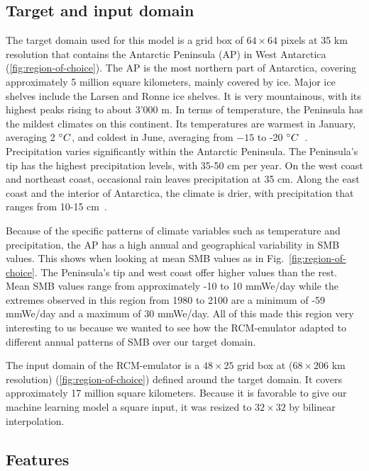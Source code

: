 \documentclass[a4paper,11pt,oneside]{report}
\begin{document}
\subsection{Target and input domain}
The target domain used for this model is a grid box of $64 \times 64$ pixels at 35 \si{km} resolution that contains the Antarctic Peninsula (AP) in West Antarctica (\autoref{fig:region-of-choice}). The AP is the most northern part of Antarctica, covering approximately 5 million square kilometers, mainly covered by ice. Major ice shelves include the Larsen and Ronne ice shelves. It is very mountainous, with its highest peaks rising to about 3'000 \si{m}. In terms of temperature, the Peninsula has the mildest climates on this continent. Its temperatures are warmest in January, averaging 2 $\degree C$, and coldest in June, averaging from $-15$ to -20 $\degree C$~\cite{AntarcticPeninsula}. Precipitation varies significantly within the Antarctic Peninsula. The Peninsula's tip has the highest precipitation levels, with 35-50 \si{cm} per year. On the west coast and northeast coast, occasional rain leaves precipitation at 35 \si{cm}. Along the east coast and the interior of Antarctica, the climate is drier, with precipitation that ranges from 10-15 \si{cm}~\cite{antarctic-climate, antarctic-climate-2}. 


 Because of the specific patterns of climate variables such as temperature and precipitation, the AP has a high annual and geographical variability in SMB values. This shows when looking at mean SMB values as in Fig.~\ref{fig:region-of-choice}. The Peninsula's tip and west coast offer higher values than the rest. Mean SMB values range from approximately -10 to 10 \si{mmWe/day} while the extremes observed in this region from 1980 to 2100 are a minimum of -59 \si{mmWe/day} and a maximum of 30 \si{mmWe/day}. All of this made this region very interesting to us because we wanted to see how the RCM-emulator adapted to different annual patterns of SMB over our target domain. 
 
 The input domain of the RCM-emulator is a $48\times25$ grid box at ($68 \times 206$ \si{km} resolution) (\autoref{fig:region-of-choice}) defined around the target domain. It covers approximately 17 million square kilometers. Because it is favorable to give our machine learning model a square input, it was resized to $32\times 32$ by bilinear interpolation. 



\subsection{Features}\label{subsec:features}
\end{document}

